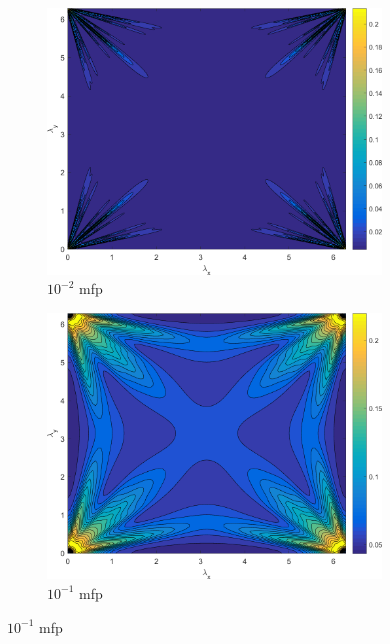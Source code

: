 \begin{figure}
\centering
	{
	\begin{subfigure}[b]{0.485\textwidth}
		\centering
		\includegraphics[width=0.975\textwidth]{figures/sec_DSA/SI_MIP_C=4_UPWLD1_LS8_x=1e-2_dydx=1_contour.png}
		\caption{$10^{-2}$ mfp}
	\end{subfigure}
	\hfill
	\begin{subfigure}[b]{0.485\textwidth}
		\centering
		\includegraphics[width=0.975\textwidth]{figures/sec_DSA/SI_MIP_C=4_UPWLD1_LS8_x=1e-1_dydx=1_contour.png}
		\caption{$10^{-1}$ mfp}
	\end{subfigure}
	}
	\vspace{0.5cm}

\end{figure}
